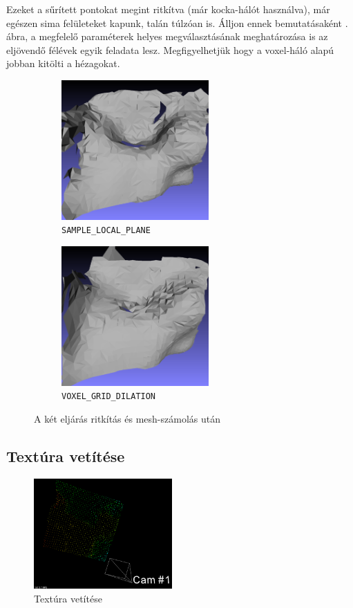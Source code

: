 \documentclass[a4paper,oneside]{article}
\begin{document}
Ezeket a sűrített pontokat megint ritkítva (már kocka-hálót használva), már egészen sima felületeket kapunk, talán túlzóan is. Álljon ennek bemutatásaként . ábra, a megfelelő paraméterek helyes megválasztásának meghatározása is az eljövendő félévek egyik feladata lesz. Megfigyelhetjük hogy a voxel-háló alapú jobban kitölti a hézagokat.

\begin{figure}[tbh]
  \centering
  \begin{subfigure}[b]{.49\linewidth}
	\centering
	\includegraphics[width=160pt]{figs/final00.png}
	\caption{\texttt{SAMPLE\_LOCAL\_PLANE} \label{fig:final1}}
  \end{subfigure}%
  \begin{subfigure}[b]{.49\linewidth}
	\centering
	\includegraphics[width=160pt]{figs/final01.png}
	\caption{\texttt{VOXEL\_GRID\_DILATION} \label{fig:final2}}
  \end{subfigure}%
\caption{A két eljárás ritkítás és mesh-számolás után \label{fig:final-surfaces}}
\end{figure}

\subsection{Textúra vetítése}

\begin{figure}[tbh]
  \centering
	\includegraphics[width=150pt]{figs/projection.png}
	\caption{Textúra vetítése \label{fig:projection}}
\end{figure}
\end{document}
